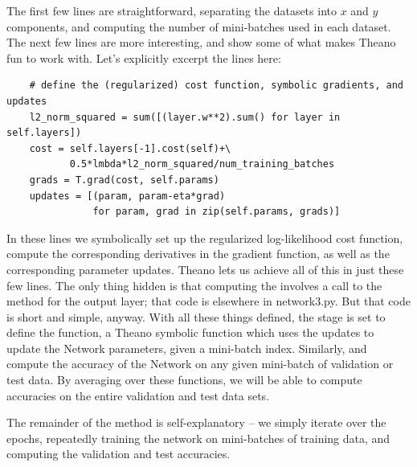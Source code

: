 \documentclass[a4paper,twoside,10pt]{book}
\begin{document}
The first few lines are straightforward, separating the datasets into $x$ and $y$ components, and computing the number of mini-batches used in each dataset. The next few lines are more interesting, and show some of what makes Theano fun to work with. Let's explicitly excerpt the lines here:
\begin{lstlisting}
    # define the (regularized) cost function, symbolic gradients, and updates
    l2_norm_squared = sum([(layer.w**2).sum() for layer in self.layers])
    cost = self.layers[-1].cost(self)+\
           0.5*lmbda*l2_norm_squared/num_training_batches
    grads = T.grad(cost, self.params)
    updates = [(param, param-eta*grad) 
               for param, grad in zip(self.params, grads)]
\end{lstlisting}
In these lines we symbolically set up the regularized log-likelihood cost function, compute the corresponding derivatives in the gradient function, as well as the corresponding parameter updates. Theano lets us achieve all of this in just these few lines. The only thing hidden is that computing the  involves a call to the  method for the output layer; that code is elsewhere in network3.py. But that code is short and simple, anyway. With all these things defined, the stage is set to define the  function, a Theano symbolic function which uses the updates to update the Network parameters, given a mini-batch index. Similarly,  and  compute the accuracy of the Network on any given mini-batch of validation or test data. By averaging over these functions, we will be able to compute accuracies on the entire validation and test data sets.

The remainder of the  method is self-explanatory -- we simply iterate over the epochs, repeatedly training the network on mini-batches of training data, and computing the validation and test accuracies.
\end{document}
